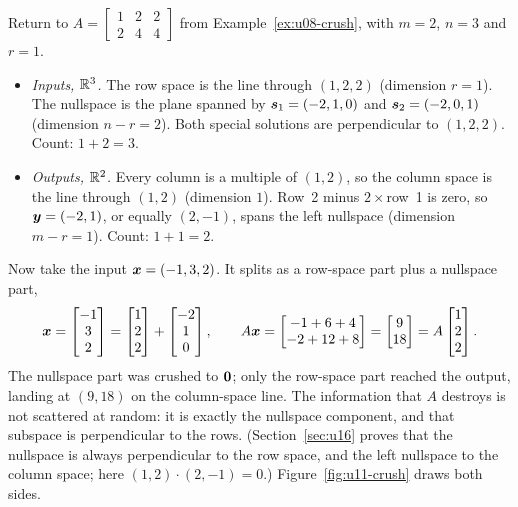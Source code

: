 \begin{example}\label{ex:u11-crush}
Return to $A=\begin{bmatrix}1&2&2\\2&4&4\end{bmatrix}$ from Example~\ref{ex:u08-crush}, with
$m=2$, $n=3$ and $r=1$.
\begin{itemize}
\item \emph{Inputs, $\mathbb{R}^3$.} The row space is the line through $(1,2,2)$ (dimension $r=1$). The
nullspace is the plane spanned by $\boldsymbol{s}_1=(-2,1,0)$ and $\boldsymbol{s}_2=(-2,0,1)$ (dimension
$n-r=2$). Both special solutions are perpendicular to $(1,2,2)$. Count: $1+2=3$.
\item \emph{Outputs, $\mathbb{R}^2$.} Every column is a multiple of $(1,2)$, so the column space is the
line through $(1,2)$ (dimension $1$). Row~2 minus $2\times$row~1 is zero, so $\boldsymbol{y}=(-2,1)$, or
equally $(2,-1)$, spans the left nullspace (dimension $m-r=1$). Count: $1+1=2$.
\end{itemize}
Now take the input $\boldsymbol{x}=(-1,3,2)$. It splits as a row-space part plus a nullspace part,
\[
\boldsymbol{x}=\begin{bmatrix}-1\\3\\2\end{bmatrix}=\begin{bmatrix}1\\2\\2\end{bmatrix}+\begin{bmatrix}-2\\1\\0\end{bmatrix},
\qquad
A\boldsymbol{x}=\begin{bmatrix}-1+6+4\\-2+12+8\end{bmatrix}=\begin{bmatrix}9\\18\end{bmatrix}
=A\begin{bmatrix}1\\2\\2\end{bmatrix}.
\]
The nullspace part was crushed to $\boldsymbol{0}$; only the row-space part reached the output, landing at
$(9,18)$ on the column-space line. The information that $A$ destroys is not scattered at random:
it is exactly the nullspace component, and that subspace is perpendicular to the rows.
(Section~\ref{sec:u16} proves that the nullspace is always perpendicular to the row space, and the
left nullspace to the column space; here $(1,2)\cdot(2,-1)=0$.) Figure~\ref{fig:u11-crush}
draws both sides.
\end{example}

